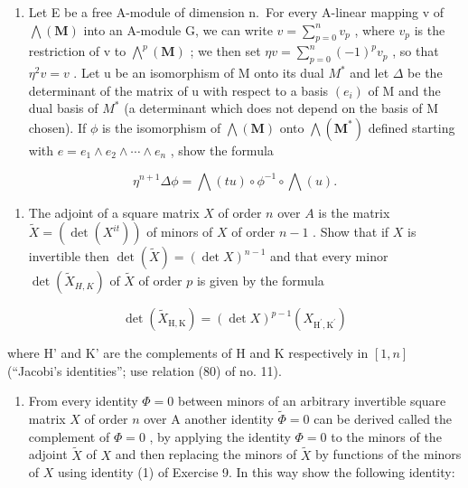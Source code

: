 \begin{enumerate}
\def\labelenumi{\arabic{enumi}.}
\setcounter{enumi}{7}
\tightlist
\item
  Let E be a free A-module of dimension n.~For every A-linear mapping v of \(\bigwedge(\mathbf{M})\) into an A-module G, we can write \(v = \sum_{p=0}^{n} v_{p}\) , where \(v_{p}\) is the restriction of v to \(\bigwedge^{p}(\mathbf{M})\) ; we then set \(\eta v = \sum_{p=0}^{n} (-1)^{p} v_{p}\) , so that \(\eta^{2} v = v\) . Let u be an isomorphism of M onto its dual \(M^{*}\) and let \(\Delta\) be the determinant of the matrix of u with respect to a basis \((e_{i})\) of M and the dual basis of \(M^{*}\) (a determinant which does not depend on the basis of M chosen). If \(\phi\) is the isomorphism of \(\bigwedge(\mathbf{M})\) onto \(\bigwedge(\mathbf{M}^{*})\) defined starting with \(e = e_{1} \wedge e_{2} \wedge \cdots \wedge e_{n}\) , show the formula
\end{enumerate}

\[
\eta^ {n + 1} \Delta \phi = \bigwedge (t u) \circ \phi^ {- 1} \circ \bigwedge (u).
\]

\begin{enumerate}
\def\labelenumi{\arabic{enumi}.}
\setcounter{enumi}{8}
\tightlist
\item
  The adjoint of a square matrix \(X\) of order \(n\) over \(A\) is the matrix \(\tilde{X} = (\det(X^{it}))\) of minors of \(X\) of order \(n - 1\) . Show that if \(X\) is invertible then \(\det(\tilde{X}) = (\det X)^{n-1}\) and that every minor \(\det(\tilde{X}_{H,K})\) of \(\tilde{X}\) of order \(p\) is given by the formula
\end{enumerate}

\[
\det (\tilde {X} _ {\mathrm{H}, \mathrm{K}}) = (\det X) ^ {p - 1} (X _ {\mathrm{H} ^ {\prime}, \mathrm{K} ^ {\prime}})\tag{1}
\]

where H' and K' are the complements of H and K respectively in \([1, n]\) (``Jacobi's identities''; use relation (80) of no. 11).

\begin{enumerate}
\def\labelenumi{\arabic{enumi}.}
\setcounter{enumi}{9}
\tightlist
\item
  From every identity \(\Phi = 0\) between minors of an arbitrary invertible square matrix \(X\) of order \(n\) over A another identity \(\tilde{\Phi} = 0\) can be derived called the complement of \(\Phi = 0\) , by applying the identity \(\Phi = 0\) to the minors of the adjoint \(\tilde{X}\) of \(X\) and then replacing the minors of \(\tilde{X}\) by functions of the minors of \(X\) using identity (1) of Exercise 9. In this way show the following identity:
\end{enumerate}

